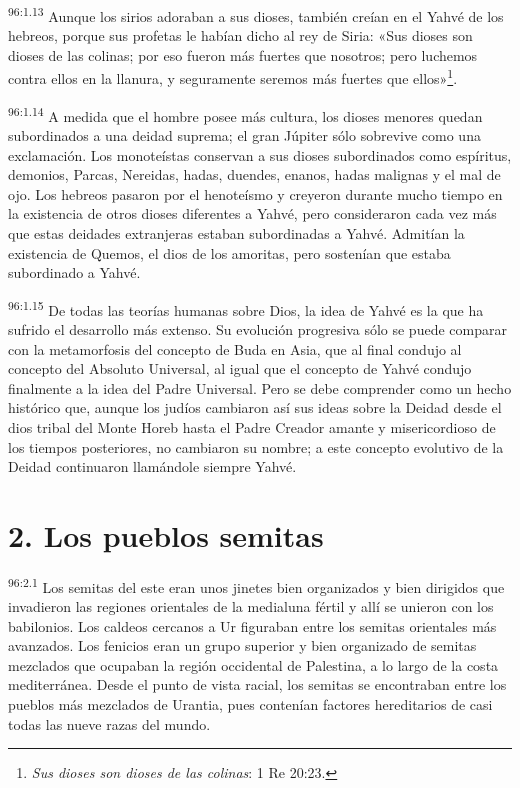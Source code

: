 \par
\textsuperscript{96:1.13} Aunque los sirios adoraban a sus dioses, también creían en el Yahvé de los hebreos, porque sus profetas le habían dicho al rey de Siria: «Sus dioses son dioses de las colinas; por eso fueron más fuertes que nosotros; pero luchemos contra ellos en la llanura, y seguramente seremos más fuertes que ellos»\footnote{\textit{Sus dioses son dioses de las colinas}: 1 Re 20:23.}.

\par
\textsuperscript{96:1.14} A medida que el hombre posee más cultura, los dioses menores quedan subordinados a una deidad suprema; el gran Júpiter sólo sobrevive como una exclamación. Los monoteístas conservan a sus dioses subordinados como espíritus, demonios, Parcas, Nereidas, hadas, duendes, enanos, hadas malignas y el mal de ojo. Los hebreos pasaron por el henoteísmo y creyeron durante mucho tiempo en la existencia de otros dioses diferentes a Yahvé, pero consideraron cada vez más que estas deidades extranjeras estaban subordinadas a Yahvé. Admitían la existencia de Quemos, el dios de los amoritas, pero sostenían que estaba subordinado a Yahvé.

\par
\textsuperscript{96:1.15} De todas las teorías humanas sobre Dios, la idea de Yahvé es la que ha sufrido el desarrollo más extenso. Su evolución progresiva sólo se puede comparar con la metamorfosis del concepto de Buda en Asia, que al final condujo al concepto del Absoluto Universal, al igual que el concepto de Yahvé condujo finalmente a la idea del Padre Universal. Pero se debe comprender como un hecho histórico que, aunque los judíos cambiaron así sus ideas sobre la Deidad desde el dios tribal del Monte Horeb hasta el Padre Creador amante y misericordioso de los tiempos posteriores, no cambiaron su nombre; a este concepto evolutivo de la Deidad continuaron llamándole siempre Yahvé.

\section*{2. Los pueblos semitas}
\par
\textsuperscript{96:2.1} Los semitas del este eran unos jinetes bien organizados y bien dirigidos que invadieron las regiones orientales de la medialuna fértil y allí se unieron con los babilonios. Los caldeos cercanos a Ur figuraban entre los semitas orientales más avanzados. Los fenicios eran un grupo superior y bien organizado de semitas mezclados que ocupaban la región occidental de Palestina, a lo largo de la costa mediterránea. Desde el punto de vista racial, los semitas se encontraban entre los pueblos más mezclados de Urantia, pues contenían factores hereditarios de casi todas las nueve razas del mundo.

